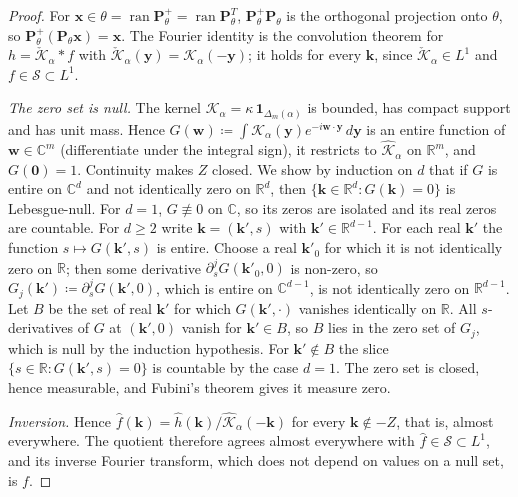 \documentclass[11pt,a4paper]{article}
\theoremstyle{plain}
\theoremstyle{definition}
\theoremstyle{remark}
\numberwithin{equation}{section}
\begin{document}
\begin{proof}
For $\mathbf{x} \in \theta = \operatorname{ran}\mathbf{P}_\theta^+ = \operatorname{ran}\mathbf{P}_\theta^T$, $\mathbf{P}_\theta^+\mathbf{P}_\theta$ is the orthogonal projection onto $\theta$, so $\mathbf{P}_\theta^+(\mathbf{P}_\theta\mathbf{x}) = \mathbf{x}$. The Fourier identity is the convolution theorem for $h = \check{\mathcal{K}}_\alpha * f$ with $\check{\mathcal{K}}_\alpha(\mathbf{y}) = \mathcal{K}_\alpha(-\mathbf{y})$; it holds for every $\mathbf{k}$, since $\check{\mathcal{K}}_\alpha \in L^1$ and $f \in \mathcal{S} \subset L^1$.

\emph{The zero set is null.} The kernel $\mathcal{K}_\alpha = \kappa\,\mathbf{1}_{\Delta_m(\alpha)}$ is bounded, has compact support and has unit mass. Hence $G(\mathbf{w}) \coloneqq \int \mathcal{K}_\alpha(\mathbf{y}) e^{-i\mathbf{w}\cdot\mathbf{y}}\,d\mathbf{y}$ is an entire function of $\mathbf{w} \in \mathbb{C}^m$ (differentiate under the integral sign), it restricts to $\widehat{\mathcal{K}}_\alpha$ on $\mathbb{R}^m$, and $G(\mathbf{0}) = 1$. Continuity makes $Z$ closed. We show by induction on $d$ that if $G$ is entire on $\mathbb{C}^d$ and not identically zero on $\mathbb{R}^d$, then $\{\mathbf{k} \in \mathbb{R}^d \colon G(\mathbf{k}) = 0\}$ is Lebesgue-null. For $d = 1$, $G \not\equiv 0$ on $\mathbb{C}$, so its zeros are isolated and its real zeros are countable. For $d \ge 2$ write $\mathbf{k} = (\mathbf{k}', s)$ with $\mathbf{k}' \in \mathbb{R}^{d-1}$. For each real $\mathbf{k}'$ the function $s \mapsto G(\mathbf{k}', s)$ is entire. Choose a real $\mathbf{k}'_0$ for which it is not identically zero on $\mathbb{R}$; then some derivative $\partial_s^j G(\mathbf{k}'_0, 0)$ is non-zero, so $G_j(\mathbf{k}') \coloneqq \partial_s^j G(\mathbf{k}', 0)$, which is entire on $\mathbb{C}^{d-1}$, is not identically zero on $\mathbb{R}^{d-1}$. Let $B$ be the set of real $\mathbf{k}'$ for which $G(\mathbf{k}', \cdot)$ vanishes identically on $\mathbb{R}$. All $s$-derivatives of $G$ at $(\mathbf{k}', 0)$ vanish for $\mathbf{k}' \in B$, so $B$ lies in the zero set of $G_j$, which is null by the induction hypothesis. For $\mathbf{k}' \notin B$ the slice $\{s \in \mathbb{R} \colon G(\mathbf{k}', s) = 0\}$ is countable by the case $d = 1$. The zero set is closed, hence measurable, and Fubini's theorem gives it measure zero.

\emph{Inversion.} Hence $\widehat{f}(\mathbf{k}) = \widehat{h}(\mathbf{k})/\widehat{\mathcal{K}}_\alpha(-\mathbf{k})$ for every $\mathbf{k} \notin -Z$, that is, almost everywhere. The quotient therefore agrees almost everywhere with $\widehat{f} \in \mathcal{S} \subset L^1$, and its inverse Fourier transform, which does not depend on values on a null set, is $f$.
\end{proof}
\end{document}
